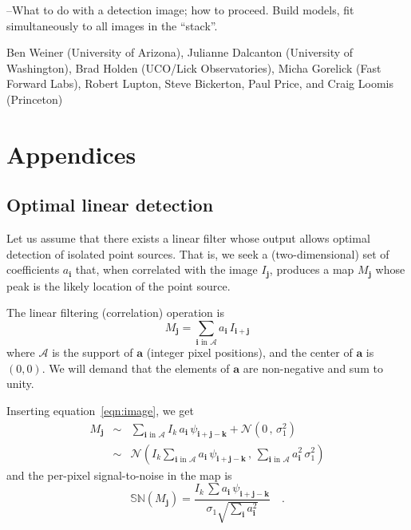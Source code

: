 \documentclass[letterpaper,preprint]{aastex62}
\newcommand{\equationname}{equation}
\newcommand{\eqnref}[1]{\mbox{\equationname~\ref{#1}}}
\newcommand{\drawnfrom}{\sim}
\newcommand{\gaussianN}{\mathcal{N}}
\newcommand{\gaussx}[2]{\gaussianN\!\left(#1 \, , \, #2\right)}
\newcommand{\psf}{\psi}
\newcommand{\psfat}[1]{\psf_{#1}}
\newcommand{\signoise}{[S/N]}
\newcommand{\snr}[1]{\mathbb{SN}(#1)}
\renewcommand{\vec}[1]{\boldsymbol{#1}}
\newcommand{\avec}{\vec{a}}
\newcommand{\ivec}{\vec{i}}
\newcommand{\jvec}{\vec{j}}
\newcommand{\kvec}{\vec{k}}
\newcommand{\coord}[2]{(#1, #2)}
\newcommand{\iina}{\ivec \,\, \mathrm{in} \,\, \mathcal{A}}
\begin{document}
--What to do with a detection image; how to proceed.  Build models,
    fit simultaneously to all images in the ``stack''.


\acknowledgements

Ben Weiner (University of Arizona),
Julianne Dalcanton (University of Washington),
Brad Holden (UCO/Lick Observatories),
Micha Gorelick (Fast Forward Labs),
Robert Lupton, Steve Bickerton, Paul Price, and Craig Loomis (Princeton)


%





\appendix

\section{Appendices}

\subsection{Optimal linear detection}
\label{app:lindet}

Let us assume that there exists a linear filter whose output allows
optimal detection of isolated point sources.  That is, we seek a
(two-dimensional) set of coefficients $a_{\ivec}$ that, when
correlated with the image $I_{\jvec}$, produces a map $M_{\jvec}$
whose peak is the likely location of the point source.


The linear filtering (correlation) operation is
\begin{equation}
M_{\jvec} = \sum_{\iina} a_{\ivec} \, I_{\ivec + \jvec}
\label{eq:detmap1}
\end{equation}
where $\mathcal{A}$ is the support of $\avec$ (integer pixel
positions), and the center of $\avec$ is $\coord{0}{0}$.  We will
demand that the elements of $\avec$ are non-negative and sum to unity.

Inserting \eqnref{eqn:image}, we get
\begin{eqnarray}
M_{\jvec} &\drawnfrom& \sum_{\iina}
  I_k \, a_{\ivec} \, \psfat{\ivec + \jvec - \kvec} + \gaussx{0}{\sigma_1^2}
  \\
&\drawnfrom& \gaussx{ I_k \sum_{\iina} a_{\ivec} \, \psfat{\ivec + \jvec - \kvec}}%
    {\sum_{\iina} a_{\ivec}^2 \, \sigma_1^2}
\end{eqnarray}
and the per-pixel signal-to-noise in the map is
\begin{equation}
  \snr{M_{\jvec}} = \frac{I_k \, \sum a_{\ivec} \, \psfat{\ivec + \jvec - \kvec}}{\sigma_1 \sqrt{\sum_{\ivec} a_{\ivec}^2}} \quad .
  \label{eq:detmapsn1}
\end{equation}
\end{document}
